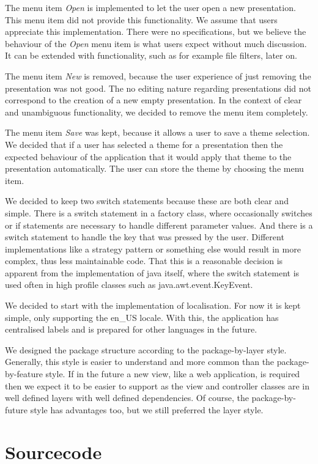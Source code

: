 \documentclass[a4paper]{article}
\begin{document}
The menu item \textit{Open} is implemented to let the user open a new presentation. This menu item did not provide this functionality. We assume that users appreciate this implementation. There were no specifications, but we believe the behaviour of the \textit{Open} menu item is what users expect without much discussion. It can be extended with functionality, such as for example file filters, later on.

The menu item \textit{New} is removed, because the user experience of just removing the presentation was not good. The no editing nature regarding presentations did not correspond to the creation of a new empty presentation. In the context of clear and unambiguous functionality, we decided to remove the menu item completely.

The menu item \textit{Save} was kept, because it allows a user to save a theme selection. We decided that if a user has selected a theme for a presentation then the expected behaviour of the application that it would apply that theme to the presentation automatically. The user can store the theme by choosing the menu item.

We decided to keep two switch statements because these are both clear and simple. There is a switch statement in a factory class, where occasionally switches or if statements are necessary to handle different parameter values. And there is a switch statement to handle the key that was pressed by the user. Different implementations like a strategy pattern or something else would result in more complex, thus less maintainable code. That this is a reasonable decision is apparent from the implementation of java itself, where the switch statement is used often in high profile classes such as java.awt.event.KeyEvent.

We decided to start with the implementation of localisation. For now it is kept simple, only supporting the en\_US locale. With this, the application has centralised labels and is prepared for other languages in the future.   

We designed the package structure according to the package-by-layer style. Generally, this style is easier to understand and more common than the package-by-feature style. If in the future a new view, like a web application, is required then we expect it to be easier to support as the view and controller classes are in well defined layers with well defined dependencies. Of course, the package-by-future style has advantages too, but we still preferred the layer style.

\section{Sourcecode}
\end{document}
